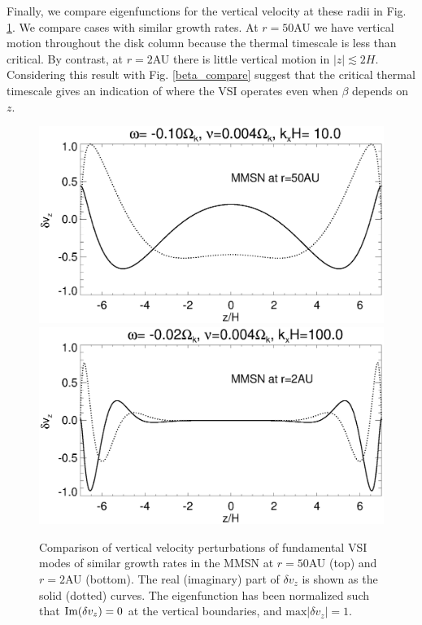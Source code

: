 Finally, we compare eigenfunctions for the vertical velocity at these
radii in Fig. \ref{mmsn_eigenvz}. We compare cases with similar growth
rates. At $r=50$AU we have vertical motion throughout the disk column
because the thermal timescale is less than critical. By contrast, at
$r=2$AU there is little vertical motion in $|z|\lesssim 2H$. 
Considering this result with Fig. \ref{beta_compare} suggest 
that the critical thermal timescale gives an indication of where the 
VSI operates even when $\beta$ depends on $z$. 


\begin{figure}
  \includegraphics[width=\linewidth,clip=true,trim=0cm 1.75cm 0cm
  0cm]{figures/eigenvectorvz_mmsn_50AU}
  \includegraphics[width=\linewidth,clip=true,trim=0cm 0.0cm 0cm
  0cm]{figures/eigenvectorvz_mmsn_2AU}
  \caption{Comparison of vertical velocity perturbations of 
    fundamental VSI modes of similar growth rates in the MMSN at
    $r=50$AU (top) and $r=2$AU (bottom). The real (imaginary) part of
    $\delta v_z$ is shown as 
    the solid (dotted) curves. The eigenfunction has been normalized
    such that $\operatorname{Im}(\delta v_z)=0$ at the vertical boundaries, and
    $\mathrm{max}|\delta v_z|=1$. \label{mmsn_eigenvz}}      
\end{figure}
















